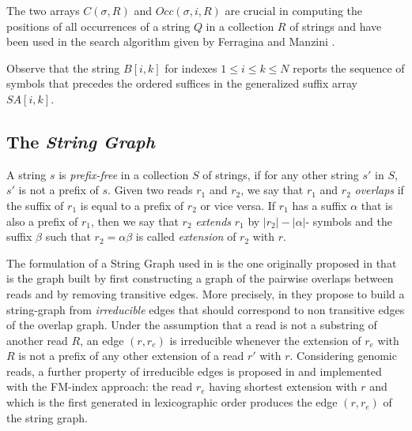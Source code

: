 \documentclass[runningheads,envcountsame,a4paper]{llncs}
\begin{document}

The two arrays $C(\sigma, R)$ and $Occ(\sigma, i, R)$ are crucial in computing  the positions of all occurrences of a string $Q$  in a collection $R$ of
strings and have been used in the search algorithm given by Ferragina and Manzini \cite{}.

Observe  that the string $B[i,k]$ for indexes $1 \leq i \leq k \leq N$ reports the sequence of symbols that precedes the ordered suffices in the generalized  suffix array $SA[i,k]$.





\subsection*{The \emph{String Graph}}


A string $s$ is \emph{prefix-free} in a collection $S$ of strings,  if  for any  other string $s'$  in $S$, $s'$ is not a prefix of $s$.
 Given two reads $r_1$ and $r_2$, we say that $r_1$ and $r_2$ {\em overlaps}    if the suffix of $r_1$ is equal to a prefix of $r_2$ or vice versa.  If $r_1$ has a suffix $\alpha$ that is also a prefix of $r_1$, then we say that $r_2$  \emph{extends} $r_1$  by $|r_2|- |\alpha|$- symbols and the suffix $\beta$ such that $r_2 = \alpha \beta$ is called \emph{extension} of  $r_2$ with $r$.

The formulation of a  String Graph  used in \cite{Simpson2010} is the one originally proposed in \cite{Myers05} that is the graph built by first constructing a graph of
the pairwise overlaps between   reads and  by removing transitive edges. More precisely, in \cite{Simpson2010} they propose to build a string-graph from \emph{irreducible} edges that should correspond  to non transitive edges  of the overlap graph.  Under the assumption that  a read is not a substring of another read $R$, an edge $(r, r_e)$  is irreducible whenever the extension of $r_e$ with $R$ is not a prefix of any other extension of a read $r'$ with $r$.  Considering genomic reads, a further property of irreducible edges is proposed in \cite{Simpson10} and implemented with the FM-index approach:  the read $r_e$ having shortest extension with $r$ and  which  is the first generated in lexicographic order produces the edge $(r,r_e)$ of the string graph.
\end{document}
